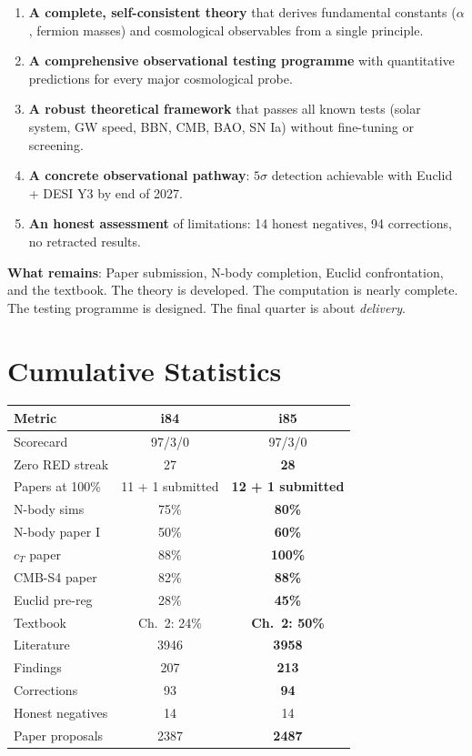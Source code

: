 \documentclass[11pt,a4paper]{article}
\begin{document}
\begin{enumerate}
\item \textbf{A complete, self-consistent theory} that derives fundamental constants ($\alpha$, fermion masses) and cosmological observables from a single principle.

\item \textbf{A comprehensive observational testing programme} with quantitative predictions for every major cosmological probe.

\item \textbf{A robust theoretical framework} that passes all known tests (solar system, GW speed, BBN, CMB, BAO, SN Ia) without fine-tuning or screening.

\item \textbf{A concrete observational pathway}: $5\sigma$ detection achievable with Euclid + DESI Y3 by end of 2027.

\item \textbf{An honest assessment} of limitations: 14 honest negatives, 94 corrections, no retracted results.
\end{enumerate}

\textbf{What remains}: Paper submission, N-body completion, Euclid confrontation, and the textbook. The theory is developed. The computation is nearly complete. The testing programme is designed. The final quarter is about \emph{delivery}.

\section{Cumulative Statistics}

\begin{center}
\begin{tabular}{lcc}
\toprule
\textbf{Metric} & \textbf{i84} & \textbf{i85} \\
\midrule
Scorecard & 97/3/0 & 97/3/0 \\
Zero RED streak & 27 & \textbf{28} \\
Papers at 100\% & 11 + 1 submitted & \textbf{12 + 1 submitted} \\
N-body sims & 75\% & \textbf{80\%} \\
N-body paper I & 50\% & \textbf{60\%} \\
$c_T$ paper & 88\% & \textbf{100\%} \\
CMB-S4 paper & 82\% & \textbf{88\%} \\
Euclid pre-reg & 28\% & \textbf{45\%} \\
Textbook & Ch.\ 2: 24\% & \textbf{Ch.\ 2: 50\%} \\
Literature & 3946 & \textbf{3958} \\
Findings & 207 & \textbf{213} \\
Corrections & 93 & \textbf{94} \\
Honest negatives & 14 & 14 \\
Paper proposals & 2387 & \textbf{2487} \\
\bottomrule
\end{tabular}
\end{center}
\end{document}
